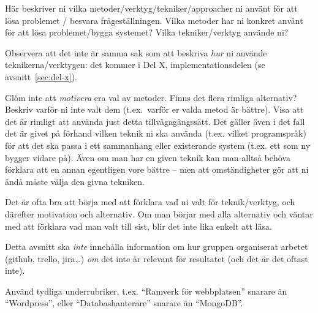 Här beskriver ni vilka metoder/verktyg/tekniker/approacher ni använt för att lösa problemet / besvara frågeställningen.  Vilka metoder har ni konkret använt för att lösa problemet/bygga systemet?  Vilka tekniker/verktyg använde ni?

Observera att det inte är samma sak som att beskriva \emph{hur} ni använde teknikerna/verktygen: det kommer i Del X, implementationsdelen (se avsnitt~\ref{sec:del-x}).

Glöm inte att \emph{motivera} era val av metoder. Finns det flera rimliga alternativ? Beskriv varför ni inte valt dem (t.ex.~varför er valda metod är bättre).
Visa att det är rimligt att använda just detta tillvägagångssätt.
Det gäller även i det fall det är givet på förhand vilken teknik ni ska använda (t.ex. vilket programspråk) för att det ska passa i ett sammanhang eller existerande system (t.ex. ett som ny bygger vidare på). 
Även om man har en given teknik kan man alltså behöva förklara att en annan egentligen vore bättre -- men att omständigheter gör att ni ändå måste välja den givna tekniken.

Det är ofta bra att börja med att förklara vad ni valt för teknik/verktyg, och därefter motivation och alternativ. Om man börjar med alla alternativ och väntar med att förklara vad man valt till sist, blir det inte lika enkelt att läsa.

Detta avsnitt ska \emph{inte} innehålla information om hur gruppen organiserat arbetet (github, trello, jira\ldots) \emph{om} det inte är relevant för resultatet (och det är det oftast inte).

Använd tydliga underrubriker, t.ex. ``Ramverk för webbplatsen'' snarare än ``Wordpress'', eller ``Databashanterare'' snarare än ``MongoDB''.

